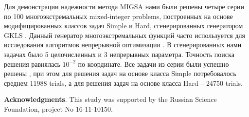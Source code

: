 \documentclass{llncs}
\begin{document}
Для демонстрации надежности метода MIGSA нами были решены четыре серии по 100 многоэкстремальных mixed-integer problems, построенных на основе модифицированных классов задач Simple и Hard, сгенерированных генератором GKLS \cite{Gaviano}. 
Данный генератор многоэкстремальных функций часто используется для исследования алгоритмов непрерывной оптимизации \cite{Paulavicius2014,SergeyevKvasov2015,Lebedev2015,Gergel2015}.
 В сгенерированных нами задачах было 5 целочисленных и 3 непрерывных параметра. Точность поиска решения равнялась $10^{-2}$ по координате. Все задачи из серии были успешно решены , при этом для решения задач на основе класса Simple потребовалось среднем 11988 trials, а для решения задач на основе класса Hard -- 24750 trials.


\textbf{Acknowledgments}. This study was supported by the Russian Science Foundation, project No 16-11-10150.
\end{document}
